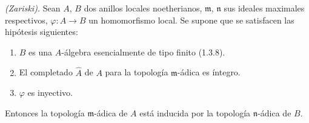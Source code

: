 \begin{corollary}[2.3.8]
\label{IV.2.3.8-fr}
\emph{(Zariski).} Sean $A$, $B$ dos anillos locales noetherianos,
$\mathfrak m$, $\mathfrak n$ sus ideales maximales respectivos,
$\varphi:A\to B$ un homomorfismo local. Se supone que se satisfacen las
hipótesis siguientes:
\begin{enumerate}
  \item[$1^\circ$] $B$ es una $A$-álgebra esencialmente de tipo finito
  \textup{(1.3.8)}.
  \item[$2^\circ$] El completado $\widehat A$ de $A$ para la topología
  $\mathfrak m$-ádica es íntegro.
  \item[$3^\circ$] $\varphi$ es inyectivo.
\end{enumerate}
Entonces la topología $\mathfrak m$-ádica de $A$ está inducida por la
topología $\mathfrak n$-ádica de $B$.
\end{corollary}

